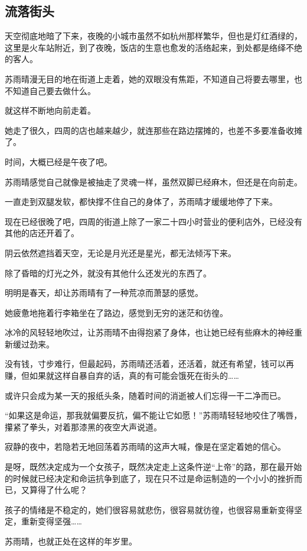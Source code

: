 \subsection{流落街头}

天空彻底地暗了下来，夜晚的小城市虽然不如杭州那样繁华，但也是灯红酒绿的，这里是火车站附近，到了夜晚，饭店的生意也愈发的活络起来，到处都是络绎不绝的客人。

苏雨晴漫无目的地在街道上走着，她的双眼没有焦距，不知道自己将要去哪里，也不知道自己要去做什么。

就这样不断地向前走着。

她走了很久，四周的店也越来越少，就连那些在路边摆摊的，也差不多要准备收摊了。

时间，大概已经是午夜了吧。

苏雨晴感觉自己就像是被抽走了灵魂一样，虽然双脚已经麻木，但还是在向前走。

一直走到双腿发软，都快撑不住自己的身体了，苏雨晴才缓缓地停了下来。

现在已经很晚了吧，四周的街道上除了一家二十四小时营业的便利店外，已经没有其他的店还开着了。

阴云依然遮挡着天空，无论是月光还是星光，都无法倾泻下来。

除了昏暗的灯光之外，就没有其他什么还发光的东西了。

明明是春天，却让苏雨晴有了一种荒凉而萧瑟的感觉。

她疲惫地拖着行李箱坐在了路边，感觉到无穷的迷茫和彷徨。

冰冷的风轻轻地吹过，让苏雨晴不由得抱紧了身体，也让她已经有些麻木的神经重新缓过劲来。

没有钱，寸步难行，但最起码，苏雨晴还活着，还活着，就还有希望，钱可以再赚，但如果就这样自暴自弃的话，真的有可能会饿死在街头的……

或许只会成为某一天的报纸头条，随着时间的消逝被人们忘得一干二净而已。

“如果这是命运，那我就偏要反抗，偏不能让它如愿！”苏雨晴轻轻地咬住了嘴唇，攥紧了拳头，对着那漆黑的夜空大声说道。

寂静的夜中，若隐若无地回荡着苏雨晴的这声大喊，像是在坚定着她的信心。

是呀，既然决定成为一个女孩子，既然决定走上这条忤逆“上帝”的路，那在最开始的时候就已经决定和命运抗争到底了，现在只不过是命运制造的一个小小的挫折而已，又算得了什么呢？

孩子的情绪是不稳定的，她们很容易就悲伤，很容易就彷徨，也很容易重新变得坚定，重新变得坚强……

苏雨晴，也就正处在这样的年岁里。

